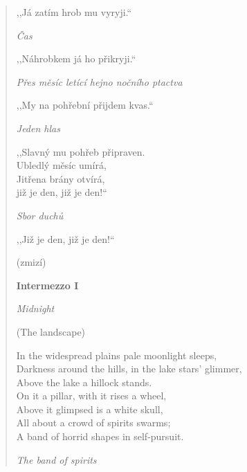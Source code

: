 \begin{verse}
\smallskip

,,Já zatím hrob mu vyryji.``

\smallskip

\textit{Čas}

\smallskip

,,Náhrobkem já ho přikryji.``

\smallskip

\textit{Přes měsíc letící hejno nočního ptactva}

\smallskip

,,My na pohřební přijdem kvas.``

\pagebreak

\textit{Jeden hlas}

\smallskip

,,Slavný mu pohřeb připraven. \\
Ubledlý měsíc umírá, \\
Jitřena brány otvírá, \\
již je den, již je den!``

\smallskip

\textit{Sbor duchů}

\smallskip

,,Již je den, již je den!``

\smallskip

(zmizí) 

\bigskip

\textbf{Intermezzo I}

\smallskip

\textit{Midnight}

\smallskip

(The landscape)

\smallskip

In the widespread plains pale moonlight sleeps, \\
Darkness around the hills, in the lake stars’ glimmer, \\
Above the lake a hillock stands. \\
On it a pillar, with it rises a wheel, \\
Above it glimpsed is a white skull, \\
All about a crowd of spirits swarms; \\
A band of horrid shapes in self-pursuit.

\smallskip

\textit{The band of spirits}

\smallskip


\end{verse}
